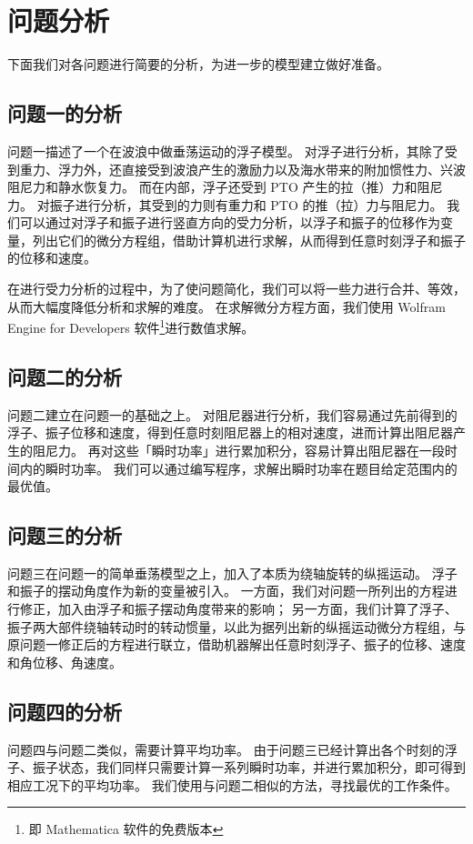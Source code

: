 \section{问题分析}

下面我们对各问题进行简要的分析，为进一步的模型建立做好准备。

\subsection{问题一的分析}

问题一描述了一个在波浪中做垂荡运动的浮子模型。
对浮子进行分析，其除了受到重力、浮力外，还直接受到波浪产生的激励力以及海水带来的附加惯性力、兴波阻尼力和静水恢复力。
而在内部，浮子还受到 PTO 产生的拉（推）力和阻尼力。
对振子进行分析，其受到的力则有重力和 PTO 的推（拉）力与阻尼力。
我们可以通过对浮子和振子进行竖直方向的受力分析，以浮子和振子的位移作为变量，列出它们的微分方程组，借助计算机进行求解，从而得到任意时刻浮子和振子的位移和速度。

在进行受力分析的过程中，为了使问题简化，我们可以将一些力进行合并、等效，从而大幅度降低分析和求解的难度。
在求解微分方程方面，我们使用 Wolfram Engine for Developers 软件\footnote{即 Mathematica 软件的免费版本}进行数值求解。

\subsection{问题二的分析}

问题二建立在问题一的基础之上。
对阻尼器进行分析，我们容易通过先前得到的浮子、振子位移和速度，得到任意时刻阻尼器上的相对速度，进而计算出阻尼器产生的阻尼力。
再对这些「瞬时功率」进行累加积分，容易计算出阻尼器在一段时间内的瞬时功率。
我们可以通过编写程序，求解出瞬时功率在题目给定范围内的最优值。

\subsection{问题三的分析}

问题三在问题一的简单垂荡模型之上，加入了本质为绕轴旋转的纵摇运动。
浮子和振子的摆动角度作为新的变量被引入。
一方面，我们对问题一所列出的方程进行修正，加入由浮子和振子摆动角度带来的影响；
另一方面，我们计算了浮子、振子两大部件绕轴转动时的转动惯量，以此为据列出新的纵摇运动微分方程组，与原问题一修正后的方程进行联立，借助机器解出任意时刻浮子、振子的位移、速度和角位移、角速度。

\subsection{问题四的分析}

问题四与问题二类似，需要计算平均功率。
由于问题三已经计算出各个时刻的浮子、振子状态，我们同样只需要计算一系列瞬时功率，并进行累加积分，即可得到相应工况下的平均功率。
我们使用与问题二相似的方法，寻找最优的工作条件。